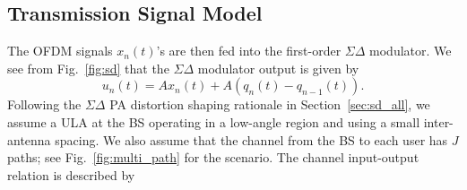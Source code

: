 \documentclass[10pt,twocolumn,twoside]{IEEEtran}
\begin{document}








\subsection{Transmission Signal Model}




The OFDM signals $x_n(t)$'s are then fed into the first-order $\Sigma \Delta$ modulator.
We see from Fig.~\ref{fig:sd} that the $\Sigma \Delta$ modulator output is given by
\begin{equation}\label{eq:sys_mod_unt}
	u_n(t) = Ax_n(t) +  A(q_n(t) -  q_{n-1}(t)).
\end{equation}
Following the $\Sigma \Delta$ PA distortion shaping rationale in Section~\ref{sec:sd_all}, we assume a ULA at the BS operating in a low-angle region and using a small inter-antenna spacing.
We also assume that the channel from the BS to each user has $J$ paths;
see Fig.~\ref{fig:multi_path} for the scenario.
The channel input-output relation is described by
\end{document}
